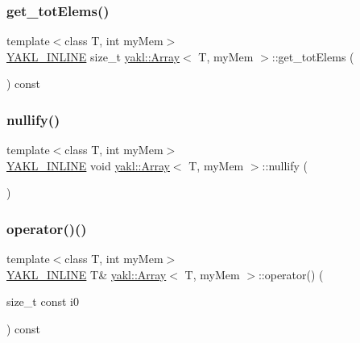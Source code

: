 \mbox{\label{classyakl_1_1Array_af527ddddda51769b64a7007c2b9bc14a}} 
\subsubsection{\texorpdfstring{get\+\_\+tot\+Elems()}{get\_totElems()}}
{\footnotesize\ttfamily template$<$class T, int my\+Mem$>$ \\
\hyperlink{YAKL_8h_aa0dd629ffce6d564b19e9313fb91a5ad}{Y\+A\+K\+L\+\_\+\+I\+N\+L\+I\+NE} size\+\_\+t \hyperlink{classyakl_1_1Array}{yakl\+::\+Array}$<$ T, my\+Mem $>$\+::get\+\_\+tot\+Elems (\begin{DoxyParamCaption}{ }\end{DoxyParamCaption}) const\hspace{0.3cm}{\ttfamily [inline]}}

\mbox{\label{classyakl_1_1Array_a0be1a80e9ce36080fe21317d929caf7a}} 
\subsubsection{\texorpdfstring{nullify()}{nullify()}}
{\footnotesize\ttfamily template$<$class T, int my\+Mem$>$ \\
\hyperlink{YAKL_8h_aa0dd629ffce6d564b19e9313fb91a5ad}{Y\+A\+K\+L\+\_\+\+I\+N\+L\+I\+NE} void \hyperlink{classyakl_1_1Array}{yakl\+::\+Array}$<$ T, my\+Mem $>$\+::nullify (\begin{DoxyParamCaption}{ }\end{DoxyParamCaption})\hspace{0.3cm}{\ttfamily [inline]}}

\mbox{\label{classyakl_1_1Array_abd51e7fc9377f49828732c6b4ca5f53a}} 
\subsubsection{\texorpdfstring{operator()()}{operator()()}\hspace{0.1cm}{\footnotesize\ttfamily [1/8]}}
{\footnotesize\ttfamily template$<$class T, int my\+Mem$>$ \\
\hyperlink{YAKL_8h_aa0dd629ffce6d564b19e9313fb91a5ad}{Y\+A\+K\+L\+\_\+\+I\+N\+L\+I\+NE} T\& \hyperlink{classyakl_1_1Array}{yakl\+::\+Array}$<$ T, my\+Mem $>$\+::operator() (\begin{DoxyParamCaption}\item[{size\+\_\+t const}]{i0 }\end{DoxyParamCaption}) const\hspace{0.3cm}{\ttfamily [inline]}}

